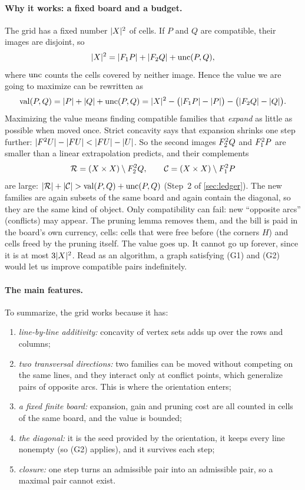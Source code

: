 \paragraph{Why it works: a fixed board and a budget.}
The grid has a fixed number $\lvert X\rvert^2$ of cells. If $P$ and $Q$ are
compatible, their images are disjoint, so
\[
 \lvert X\rvert^2=\lvert F_1 P\rvert+\lvert F_2 Q\rvert+\operatorname{unc}(P,Q),
\]
where $\operatorname{unc}$ counts the cells covered by neither image. Hence the value we
are going to maximize can be rewritten as
\[
 \operatorname{val}(P,Q)=\lvert P\rvert+\lvert Q\rvert+\operatorname{unc}(P,Q)
 =\lvert X\rvert^2-\bigl(\lvert F_1 P\rvert-\lvert P\rvert\bigr)-\bigl(\lvert F_2 Q\rvert-\lvert Q\rvert\bigr).
\]
Maximizing the value means finding compatible families that \emph{expand}
as little as possible when moved once. Strict concavity says that expansion
shrinks one step further: $\lvert F^2U\rvert-\lvert FU\rvert<\lvert FU\rvert-\lvert U\rvert$. So the second
images $F_2^2Q$ and $F_1^2P$ are smaller than a linear extrapolation
predicts, and their complements
\[
 \mathcal R=(X\times X)\setminus F_2^2Q,\qquad \mathcal C=(X\times X)\setminus F_1^2P
\]
are large: $\lvert \mathcal R\rvert+\lvert \mathcal C\rvert>\operatorname{val}(P,Q)+\operatorname{unc}(P,Q)$ (Step~2 of \cref{sec:ledger}).
The new families are again subsets of the same board and again contain the
diagonal, so they are the same kind of object. Only compatibility can fail:
new ``opposite arcs'' (conflicts) may appear. The pruning lemma removes them,
and the bill is paid in the board's own currency, cells: cells that were free
before (the corners $H$) and cells freed by the pruning itself. The value
goes up. It cannot go up forever, since it is at most $3\lvert X\rvert^2$. Read as
an algorithm, a graph satisfying (G1) and (G2) would let us improve
compatible pairs indefinitely.

\paragraph{The main features.} To summarize, the grid works because it has:
\begin{enumerate}[label=(\roman*),leftmargin=*]
\item \emph{line-by-line additivity:} concavity of vertex sets adds up over
the rows and columns;
\item \emph{two transversal directions:} two families can be moved
without competing on the same lines, and they interact only at conflict
points, which generalize pairs of opposite arcs. This is where the
orientation enters;
\item \emph{a fixed finite board:} expansion, gain and pruning cost are all
counted in cells of the same board, and the value is bounded;
\item \emph{the diagonal:} it is the seed provided by the orientation, it
keeps every line nonempty (so (G2) applies), and it survives each step;
\item \emph{closure:} one step turns an admissible pair into an admissible
pair, so a maximal pair cannot exist.
\end{enumerate}

